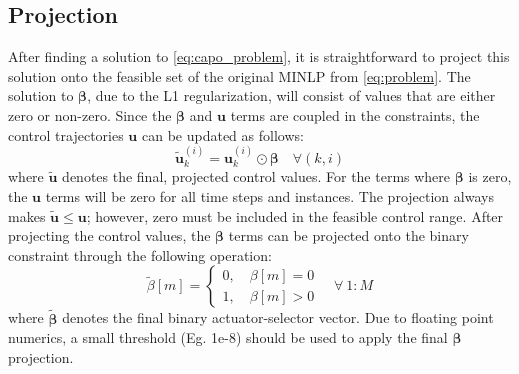 \documentclass[runningheads]{llncs}
\begin{document}
\vspace{-15pt}
\subsection{Projection}
After finding a solution to \eqref{eq:capo_problem}, it is straightforward to project this solution onto the feasible set of the original MINLP from \eqref{eq:problem}. The solution to $\boldsymbol{\beta}$, due to the L1 regularization, will consist of values that are either zero or non-zero. Since the $\boldsymbol{\beta}$ and $\textbf{u}$ terms are coupled in the constraints, the control trajectories $\textbf{u}$ can be updated as follows:
\begin{equation}
      \tilde{\textbf{u}}^{(i)}_k = \textbf{u}^{(i)}_k \odot \boldsymbol{\beta} \quad \forall (k,i) 
\end{equation}
where $\tilde{\textbf{u}}$ denotes the final, projected control values. For the terms where $\boldsymbol{\beta}$ is zero, the $\textbf{u}$ terms will be zero for all time steps and instances. The projection always makes $\tilde{\textbf{u}} \leq \textbf{u}$; however, zero must be included in the feasible control range. After projecting the control values, the $\boldsymbol{\beta}$ terms can be projected onto the binary constraint through the following operation: 
\begin{equation}
 \tilde{\beta}[m] = \begin{cases}
0 ,\quad {\beta[m] = 0} \\
1 ,\quad {\beta[m] > 0}
 \end{cases} \quad \forall \ 1:M
\end{equation}
where $\boldsymbol{\tilde\beta}$ denotes the final binary actuator-selector vector. Due to floating point numerics, a small threshold (Eg. 1e-8) should be used to apply the final $\boldsymbol{\beta}$ projection. 

\vspace{-15pt}
\end{document}
